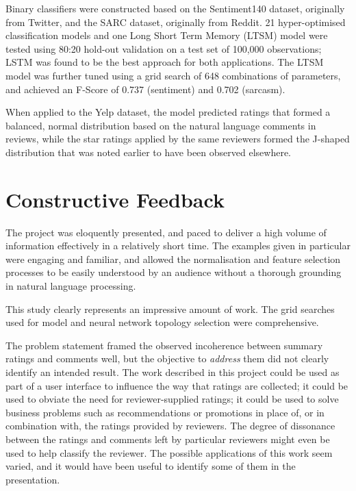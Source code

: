 \documentclass[fontsize=9pt,letterpaper,twocolumn]{scrartcl}
\begin{document}
Binary classifiers were constructed based on the Sentiment140\cite{Sentiment140} dataset, originally from Twitter, and the SARC\cite{arXiv:1704.05579v4} dataset, originally from Reddit.  21 hyper-optimised classification models and one Long Short Term Memory (LTSM) model were tested using 80:20 hold-out validation on a test set of 100,000 observations; LSTM was found to be the best approach for both applications. The LTSM model was further tuned using a grid search of 648 combinations of parameters, and achieved an F-Score of 0.737 (sentiment) and 0.702 (sarcasm).

When applied to the Yelp dataset, the model predicted ratings that formed a balanced, normal distribution based on the natural language comments in reviews, while the star ratings applied by the same reviewers formed the J-shaped distribution that was noted earlier to have been observed elsewhere.

\section{Constructive Feedback}
The project was eloquently presented, and paced to deliver a high volume of information effectively in a relatively short time. The examples given in particular were engaging and familiar, and allowed the normalisation and feature selection processes to be easily understood by an audience without a thorough grounding in natural language processing.

This study clearly represents an impressive amount of work. The grid searches used for model and neural network topology selection were comprehensive.

The problem statement framed the observed incoherence between summary ratings and comments well, but the objective to \emph{address} them did not clearly identify an intended result. The work described in this project could be used as part of a user interface to influence the way that ratings are collected; it could be used to obviate the need for reviewer-supplied ratings;  it could be used to solve business problems such as recommendations or promotions in place of, or in combination with, the ratings provided by reviewers. The degree of dissonance between the ratings and comments left by particular reviewers might even be used to help classify the reviewer. The possible applications of this work seem varied, and it would have been useful to identify some of them in the presentation.



\end{document}
